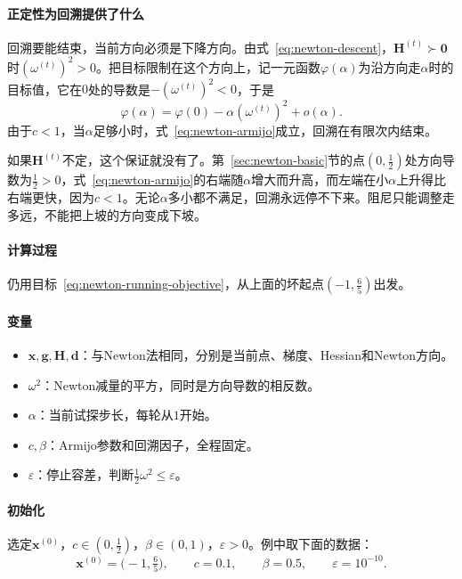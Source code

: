 \paragraph{正定性为回溯提供了什么}
回溯要能结束，当前方向必须是下降方向。由式~\eqref{eq:newton-descent}，$\bm{H}^{(t)}\succ\bm{0}$时$(\omega^{(t)})^2>0$。把目标限制在这个方向上，记一元函数$\varphi(\alpha)$为沿方向走$\alpha$时的目标值，它在$0$处的导数是$-(\omega^{(t)})^2<0$，于是
\[
 \varphi(\alpha)=\varphi(0)-\alpha(\omega^{(t)})^2+o(\alpha).
\]
由于$c<1$，当$\alpha$足够小时，式~\eqref{eq:newton-armijo}成立，回溯在有限次内结束。

如果$\bm{H}^{(t)}$不定，这个保证就没有了。第~\ref{sec:newton-basic}节的点$(0,\tfrac12)$处方向导数为$\tfrac12>0$，式~\eqref{eq:newton-armijo}的右端随$\alpha$增大而升高，而左端在小$\alpha$上升得比右端更快，因为$c<1$。无论$\alpha$多小都不满足，回溯永远停不下来。阻尼只能调整走多远，不能把上坡的方向变成下坡。

\paragraph{计算过程}
仍用目标~\eqref{eq:newton-running-objective}，从上面的坏起点$(-1,\tfrac65)$出发。

\paragraph{变量}
\begin{itemize}
 \item $\bm{x},\bm{g},\bm{H},\bm{d}$：与Newton法相同，分别是当前点、梯度、Hessian和Newton方向。
 \item $\omega^2$：Newton减量的平方，同时是方向导数的相反数。
 \item $\alpha$：当前试探步长，每轮从$1$开始。
 \item $c,\beta$：Armijo参数和回溯因子，全程固定。
 \item $\varepsilon$：停止容差，判断$\tfrac12\omega^2\leq\varepsilon$。
\end{itemize}

\paragraph{初始化}
选定$\bm{x}^{(0)}$，$c\in(0,\tfrac12)$，$\beta\in(0,1)$，$\varepsilon>0$。例中取下面的数据：
\[
 \bm{x}^{(0)}=\bigl(-1,\tfrac65\bigr),\qquad c=0.1,\qquad \beta=0.5,\qquad \varepsilon=10^{-10}.
\]

